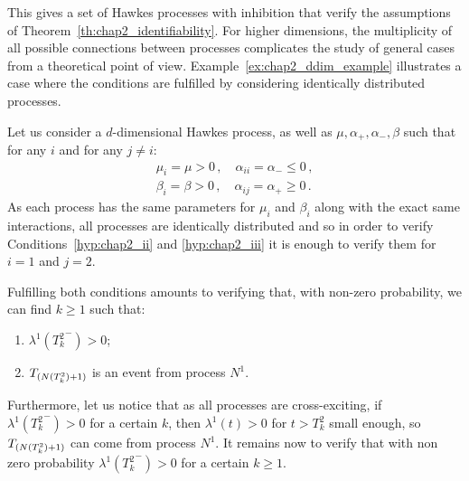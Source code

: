     This gives a set of Hawkes processes with inhibition that verify the assumptions of Theorem~\ref{th:chap2_identifiability}. For higher dimensions, the multiplicity of all possible connections between processes complicates the study of general cases from a theoretical point of view. Example~\ref{ex:chap2_ddim_example} illustrates a case where the conditions are fulfilled by considering identically distributed processes.

    \begin{example}\label{ex:chap2_ddim_example}
        Let us consider a $d$-dimensional Hawkes process,
        as well as $\mu, \alpha_+, \alpha_-, \beta$ such that for any $i$ and for any $j\neq i$:
        \begin{align*}
    	\mu_i = \mu > 0\,,     \quad    \alpha_{ii} = \alpha_- \leq 0\,,\\ 
	    \beta_i = \beta > 0\,, \quad \alpha_{ij} = \alpha_+ \geq 0\,.
        \end{align*}
        As each process has the same parameters for $\mu_i$ and $\beta_i$ along with the exact same interactions, all processes are identically distributed and so in order to verify Conditions~\ref{hyp:chap2_ii} and \ref{hyp:chap2_iii} it is enough to verify them for $i=1$ and $j=2$.

        Fulfilling both conditions amounts to verifying that, with non-zero probability, we can find $k\ge1$ such that:
        \begin{enumerate}
            \item $\lambda^1({T_k^2}^-) > 0$;
            \item $T\park[N(T_k^2) + 1]$ is an event from process $N^1$.
        \end{enumerate}

        Furthermore, let us notice that as all processes are cross-exciting, if $\lambda^1({T_k^2}^-) > 0$ for a certain $k$, then $\lambda^1(t) > 0$ for $t>T_k^2$ small enough, so $T\park[N(T_k^2) + 1]$ can come from process $N^1$. It remains now to verify that with non zero probability $\lambda^1({T_k^2}^-) > 0$ for a certain $k\ge1$. 


\end{example}
